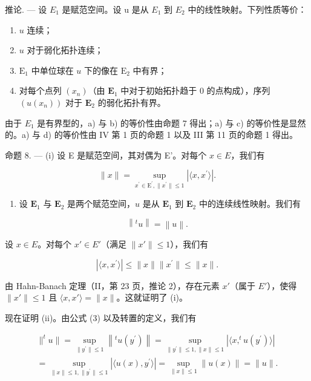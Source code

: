 推论. --- 设 \(E_{1}\) 是赋范空间。设 u 是从 \(E_{1}\) 到 \(E_{2}\) 中的线性映射。下列性质等价：

\begin{enumerate}
\def\labelenumi{\alph{enumi})}
\item
  \(u\) 连续；
\item
  \(u\) 对于弱化拓扑连续；
\item
  \(\mathrm{E}_1\) 中单位球在 \(u\) 下的像在 \(\mathrm{E}_2\) 中有界；
\item
  对每个点列 \((x_{n})\)（由 \(\mathbf{E}_1\) 中对于初始拓扑趋于 0 的点构成），序列 \((u(x_{n}))\) 对于 \(\mathbf{E}_2\) 的弱化拓扑有界。
\end{enumerate}

由于 \(E_{1}\) 是有界型的，a) 与 b) 的等价性由命题 7 得出；a) 与 c) 的等价性是显然的。a) 与 d) 的等价性由 IV 第 1 页的命题 1 以及 III 第 11 页的命题 1 得出。

命题 8. --- (i) 设 E 是赋范空间，其对偶为 E'。对每个 \(x \in E\)，我们有

\[
\| x \| = \sup _ {x ^ {\prime} \in \mathrm{E} ^ {\prime}, \| x ^ {\prime} \| \leqslant 1} | \langle x, x ^ {\prime} \rangle |.\tag{3}
\]

\begin{enumerate}
\def\labelenumi{(\roman{enumi})}
\setcounter{enumi}{1}
\tightlist
\item
  设 \(\mathbf{E}_1\) 与 \(\mathbf{E}_2\) 是两个赋范空间，\(u\) 是从 \(\mathbf{E}_1\) 到 \(\mathbf{E}_2\) 中的连续线性映射。我们有
\end{enumerate}

\[
\left\| ^ {t} u \right\| = \left\| u \right\|.\tag{4}
\]

设 \(x \in E\)。对每个 \(x' \in E'\)（满足 \(\| x' \| \leqslant 1\)），我们有

\[
\left| \langle x, x ^ {\prime} \rangle \right| \leqslant \| x \| \| x ^ {\prime} \| \leqslant \| x \|.
\]

由 Hahn-Banach 定理（II，第 23 页，推论 2），存在元素 \(x'\)（属于 \(E'\)），使得 \(\| x' \| \leqslant 1\) 且 \(\langle x, x' \rangle = \| x \|\)。这就证明了 (i)。

现在证明 (ii)。由公式 (3) 以及转置的定义，我们有

\[
\begin{array}{l} \| ^ {t} u \| = \sup _ {\| y ^ {\prime} \| \leqslant 1} \left\| ^ {t} u (y ^ {\prime}) \right\| = \sup _ {\| y ^ {\prime} \| \leqslant 1, \| x \| \leqslant 1} \left| \langle x, ^ {t} u (y ^ {\prime}) \rangle \right| \\ = \sup _ {\| x \| \leqslant 1, \| y ^ {\prime} \| \leqslant 1} \left| \langle u (x), y ^ {\prime} \rangle \right| = \sup _ {\| x \| \leqslant 1} \left\| u (x) \right\| = \| u \|. \end{array}
\]


